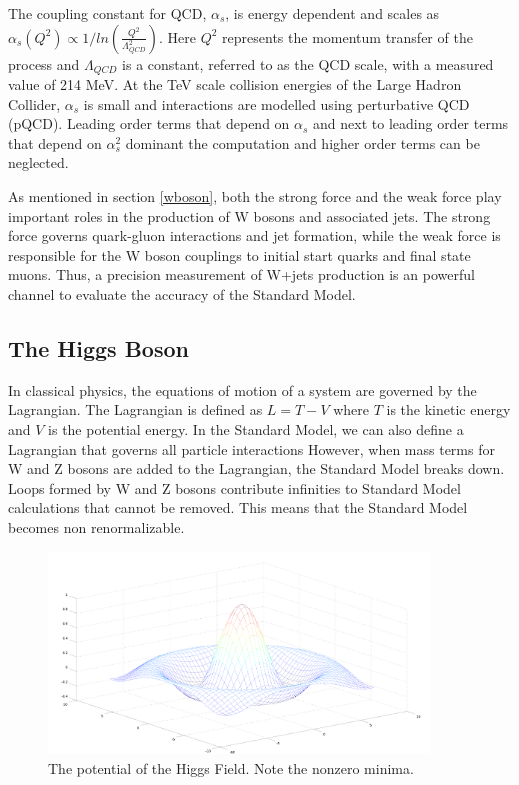 \documentclass[oneside, letterpaper, oldfontcommands]{memoir}
\begin{document}
\qquad The coupling constant for QCD, $\alpha_{s}$, is energy dependent and scales as $\alpha_{s}(Q^{2}) \propto 1/ln(\frac{Q^{2}}{\Lambda_{QCD}^{2}})$. Here $Q^{2}$ represents the momentum transfer of the process and $\Lambda_{QCD}$ is a constant, referred to as the QCD scale, with a measured value of 214 MeV\cite{Agashe:2014kda}. At the TeV scale collision energies of the Large Hadron Collider, $\alpha_{s}$ is small and interactions are modelled using perturbative QCD (pQCD). Leading order terms that depend on $\alpha_{s}$ and next to leading order terms that depend on $\alpha_{s}^{2}$ dominant the computation and higher order terms can be neglected.

\qquad As mentioned in section \ref{wboson}, both the strong force and the weak force play important roles in the production of W bosons and associated jets. The strong force governs quark-gluon interactions and jet formation, while the weak force is responsible for the W boson couplings to initial start quarks and final state muons. Thus, a precision measurement of W+jets production is an powerful channel to evaluate the accuracy of the Standard Model.



\subsection{The Higgs Boson}\label{higgstheory}
\qquad In classical physics, the equations of motion of a system are governed by the Lagrangian. The Lagrangian is defined as $L = T - V$ where $T$ is the kinetic energy and $V$ is the potential energy. In the Standard Model, we can also define a Lagrangian that governs all particle interactions\cite{Halzen:1984mc} However, when mass terms for W and Z bosons are added to the Lagrangian, the Standard Model breaks down. Loops formed by W and Z bosons contribute infinities to Standard Model calculations that cannot be removed. This means that the Standard Model becomes non renormalizable. 

\begin{figure}[here]
\includegraphics[width=0.9\textwidth]{HiggsPotential.png}
\caption{The potential of the Higgs Field. Note the nonzero minima.}
\label{fig:HiggsPotential}
\end{figure}
\end{document}
